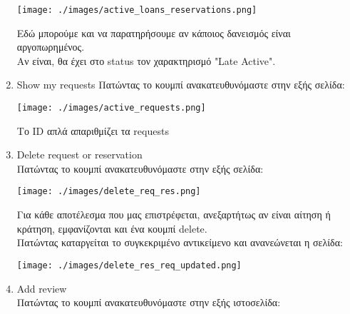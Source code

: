 \documentclass[14pt]{report}
\begin{document}
\begin{enumerate}[label=(\arabic*)]
 		\texttt{[image: ./images/active\_loans\_reservations.png]}
 		
 		\vspace{\baselineskip}
 		
 		Εδώ μπορούμε και να παρατηρήσουμε αν κάποιος δανεισμός είναι αργοπωρημένος. \\
 		Αν είναι, θα έχει στο status τον χαρακτηρισμό "Late Active".\\
 		
 		\newpage
 		\hypertarget{s-show-requests}{}
 		\item Show my requests
 		Πατώντας το κουμπί ανακατευθυνόμαστε στην εξής σελίδα: \\
 		
 		\vspace{\baselineskip}
 		
 		\texttt{[image: ./images/active\_requests.png]}
 		
 		\vspace{\baselineskip}
 		
 		Το ID απλά απαριθμίζει τα requests
 		
 		\newpage
 		\hypertarget{s-delete}{}
 		\item Delete request or reservation \\
 		Πατώντας το κουμπί ανακατευθυνόμαστε στην εξής σελίδα: \\
 		
 		\vspace{\baselineskip}
 		
 		\texttt{[image: ./images/delete\_req\_res.png]}
 		
 		\vspace{\baselineskip}
 		
 		Για κάθε αποτέλεσμα που μας επιστρέφεται, ανεξαρτήτως αν είναι αίτηση ή κράτηση, εμφανίζονται και ένα κουμπί delete. \\
 		Πατώντας καταργείται το συγκεκριμένο αντικείμενο και ανανεώνεται η σελίδα: \\ 
 		
 		\vspace{\baselineskip}
 		
 		\texttt{[image: ./images/delete\_res\_req\_updated.png]}
 		
 		\vspace{\baselineskip}
 		
 		\newpage
 		\hypertarget{s-review}{}
 		\item Add review \\ 
 		Πατώντας το κουμπί ανακατευθυνόμαστε στην εξής ιστοσελίδα: \\
 		

\end{enumerate}
\end{document}
